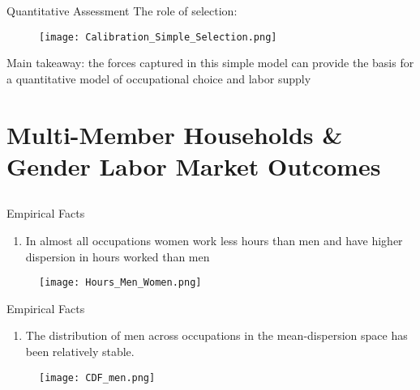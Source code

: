 \documentclass[hyperref={bookmarks=false}]{beamer}
\newcounter{ResumeEnumerate}
\begin{document}
\begin{frame}{Quantitative Assessment}
The role of selection:
\begin{figure}[!t]
\centering
\begin{minipage}[b]{0.65\textwidth}{}
\centering
\texttt{[image: Calibration\_Simple\_Selection.png]}
\end{minipage}
\end{figure}
Main takeaway: the forces captured in this simple model can provide the basis for a quantitative model of occupational choice and labor supply
\end{frame}


\section{Multi-Member Households \& Gender Labor Market Outcomes}
\subsection{}

\begin{frame}
\end{frame}

\begin{frame}{Empirical Facts}
\begin{enumerate}
\item In almost all occupations women work less hours than men and have higher dispersion in hours worked than men
\end{enumerate}
\begin{figure}[!t]
\centering
\begin{minipage}[b]{0.9\textwidth}{}
\centering
\texttt{[image: Hours\_Men\_Women.png]}
\end{minipage}
\end{figure}
\setcounter{ResumeEnumerate}{\value{enumi}}
\end{frame}

\begin{frame}{Empirical Facts}
\begin{enumerate}[start=\numexpr\value{ResumeEnumerate}+1]
\item The distribution of men across occupations in the mean-dispersion space has been relatively stable.
\end{enumerate}
\begin{figure}[!t]
\centering
\begin{minipage}[b]{0.9\textwidth}{}
\centering
\texttt{[image: CDF\_men.png]}
\end{minipage}
\end{figure}
\setcounter{ResumeEnumerate}{\value{enumi}}
\end{frame}
\end{document}
